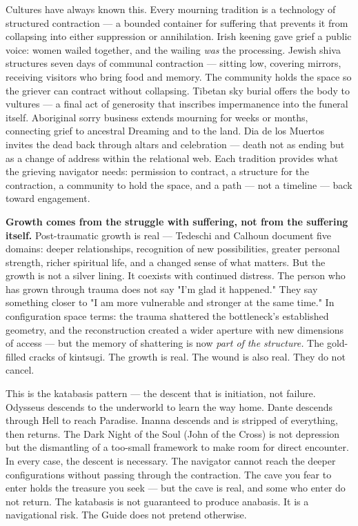 Cultures have always known this. Every mourning tradition is a technology of structured contraction — a bounded container for suffering that prevents it from collapsing into either suppression or annihilation. Irish keening gave grief a public voice: women wailed together, and the wailing \textit{was} the processing. Jewish shiva structures seven days of communal contraction — sitting low, covering mirrors, receiving visitors who bring food and memory. The community holds the space so the griever can contract without collapsing. Tibetan sky burial offers the body to vultures — a final act of generosity that inscribes impermanence into the funeral itself. Aboriginal sorry business extends mourning for weeks or months, connecting grief to ancestral Dreaming and to the land. Dia de los Muertos invites the dead back through altars and celebration — death not as ending but as a change of address within the relational web. Each tradition provides what the grieving navigator needs: permission to contract, a structure for the contraction, a community to hold the space, and a path — not a timeline — back toward engagement.


\textbf{Growth comes from the struggle with suffering, not from the suffering itself.} Post-traumatic growth is real — Tedeschi and Calhoun document five domains: deeper relationships, recognition of new possibilities, greater personal strength, richer spiritual life, and a changed sense of what matters. But the growth is not a silver lining. It coexists with continued distress. The person who has grown through trauma does not say "I'm glad it happened." They say something closer to "I am more vulnerable and stronger at the same time." In configuration space terms: the trauma shattered the bottleneck's established geometry, and the reconstruction created a wider aperture with new dimensions of access — but the memory of shattering is now \textit{part of the structure.} The gold-filled cracks of kintsugi. The growth is real. The wound is also real. They do not cancel.


This is the katabasis pattern — the descent that is initiation, not failure. Odysseus descends to the underworld to learn the way home. Dante descends through Hell to reach Paradise. Inanna descends and is stripped of everything, then returns. The Dark Night of the Soul (John of the Cross) is not depression but the dismantling of a too-small framework to make room for direct encounter. In every case, the descent is necessary. The navigator cannot reach the deeper configurations without passing through the contraction. The cave you fear to enter holds the treasure you seek — but the cave is real, and some who enter do not return. The katabasis is not guaranteed to produce anabasis. It is a navigational risk. The Guide does not pretend otherwise.


